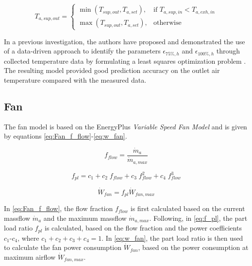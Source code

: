 \begin{equation}
    T_{a,sup,out} = \begin{cases}
        \min (T_{sup,out}, T_{a,set}),& \text{if } T_{a,sup,in}<T_{a,exh,in}\\
        \max (T_{sup,out}, T_{a,set}),              & \text{otherwise}
    \end{cases}
    \label{eq:T_supairout_corrected}
\end{equation}

In a previous investigation, the authors have proposed and demonstrated the use of a data-driven approach to identify the parameters $\epsilon_{75\%,h}$ and $\epsilon_{100\%,h}$ through collected temperature data by formulating a least squares optimization problem \cite{BJORNSKOV2022104277}. The resulting model provided good prediction accuracy on the outlet air temperature compared with the measured data. 


\subsection{Fan}


The fan model is based on the EnergyPlus \textit{Variable Speed Fan Model} \cite{energy2021a} and is given by equations \ref{eq:Fan_f_flow}-\ref{eq:w_fan}.



\begin{equation}
    f_{flow} = \frac{\dot{m}_a}{\dot{m}_{a,max}}
    \label{eq:Fan_f_flow}
\end{equation}

\begin{equation}
    f_{pl} = c_1 + c_2 \; f_{flow} + c_3 \; f^2_{flow} + c_4 \; f^3_{flow}
    \label{eq:f_pl}
\end{equation}

\begin{equation}
    \dot{W}_{fan} = f_{pl} \dot{W}_{fan,max}
    \label{eq:w_fan}
\end{equation}


In \autoref{eq:Fan_f_flow}, the flow fraction $f_{flow}$ is first calculated based on the current massflow $\dot{m}_a$ and the maximum massflow $\dot{m}_{a,max}$. Following, in \autoref{eq:f_pl}, the part load ratio $f_{pl}$ is calculated, based on the flow fraction and the power coefficients $c_1$-$c_4$, where $c_1+c_2+c_3+c_4=1$. In \autoref{eq:w_fan}, the part load ratio is then used to calculate the fan power consumption $\dot{W}_{fan}$, based on the power consumption at maximum airflow $\dot{W}_{fan,max}$. 

